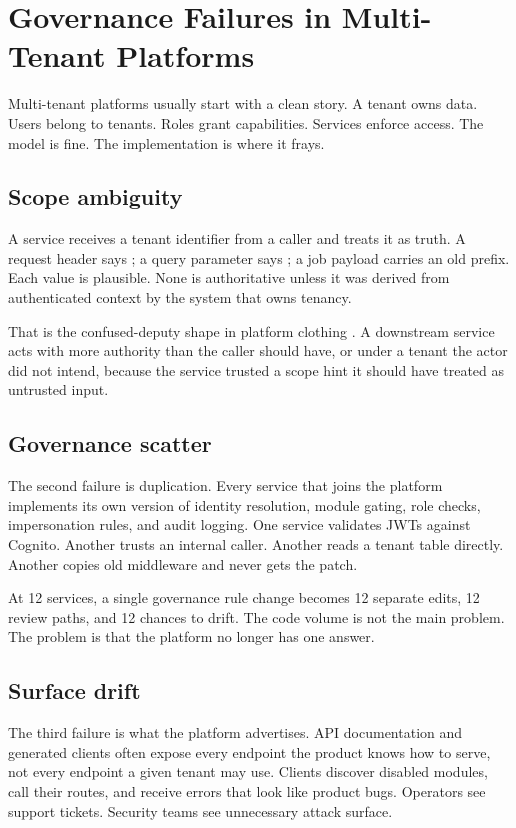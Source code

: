 \section{Governance Failures in Multi-Tenant Platforms}
\label{sec:problem}

Multi-tenant platforms usually start with a clean story. A tenant owns data. Users belong to tenants. Roles grant capabilities. Services enforce access. The model is fine. The implementation is where it frays.

\subsection{Scope ambiguity}

A service receives a tenant identifier from a caller and treats it as truth. A request header says ; a query parameter says ; a job payload carries an old prefix. Each value is plausible. None is authoritative unless it was derived from authenticated context by the system that owns tenancy.

That is the confused-deputy shape in platform clothing \cite{confused_deputy}. A downstream service acts with more authority than the caller should have, or under a tenant the actor did not intend, because the service trusted a scope hint it should have treated as untrusted input.

\subsection{Governance scatter}

The second failure is duplication. Every service that joins the platform implements its own version of identity resolution, module gating, role checks, impersonation rules, and audit logging. One service validates JWTs against Cognito. Another trusts an internal caller. Another reads a tenant table directly. Another copies old middleware and never gets the patch.

At 12 services, a single governance rule change becomes 12 separate edits, 12 review paths, and 12 chances to drift. The code volume is not the main problem. The problem is that the platform no longer has one answer.

\subsection{Surface drift}

The third failure is what the platform advertises. API documentation and generated clients often expose every endpoint the product knows how to serve, not every endpoint a given tenant may use. Clients discover disabled modules, call their routes, and receive errors that look like product bugs. Operators see support tickets. Security teams see unnecessary attack surface.

